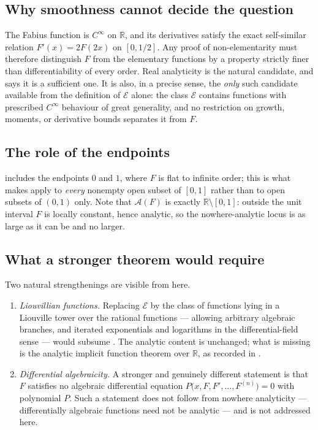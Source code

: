 \documentclass[11pt,oneside]{article}
\theoremstyle{definition}
\theoremstyle{remark}
\newcommand{\R}{\mathbb R}
\newcommand{\Elem}{\mathcal E}
\newcommand{\An}{\mathcal A}
\begin{document}
\subsection{Why smoothness cannot decide the question}

The Fabius function is $C^\infty$ on $\R$, and its derivatives satisfy the
exact self-similar relation $F'(x)=2F(2x)$ on $[0,1/2]$.  Any proof of
non-elementarity must therefore distinguish $F$ from the elementary functions
by a property strictly finer than differentiability of every order.  Real
analyticity is the natural candidate, and  says it is a
sufficient one.  It is also, in a precise sense, the \emph{only} such
candidate available from the definition of $\Elem$ alone: the class $\Elem$
contains functions with prescribed $C^\infty$ behaviour of great generality,
and no restriction on growth, moments, or derivative bounds separates it from
$F$.

\subsection{The role of the endpoints}

 includes the endpoints $0$ and $1$, where $F$ is flat to
infinite order; this is what makes  apply to \emph{every}
nonempty open subset of $[0,1]$ rather than to open subsets of $(0,1)$ only.
Note that $\An(F)$ is exactly $\R\setminus[0,1]$: outside the unit interval
$F$ is locally constant, hence analytic, so the nowhere-analytic locus is as
large as it can be and no larger.

\subsection{What a stronger theorem would require}

Two natural strengthenings are visible from here.

\begin{enumerate}
\item \emph{Liouvillian functions.}  Replacing $\Elem$ by the class of
      functions lying in a Liouville tower over the rational functions ---
      allowing arbitrary algebraic branches, and iterated exponentials and
      logarithms in the differential-field sense --- would subsume
      .  The analytic content is unchanged; what is missing is
      the analytic implicit function theorem over $\R$, as recorded in
      .
\item \emph{Differential algebraicity.}  A stronger and genuinely different
      statement is that $F$ satisfies no algebraic differential equation
      $P\bigl(x,F,F',\ldots,F^{(n)}\bigr)=0$ with polynomial $P$.  Such a
      statement does not follow from nowhere analyticity --- differentially
      algebraic functions need not be analytic --- and is not addressed here.
\end{enumerate}
\end{document}
